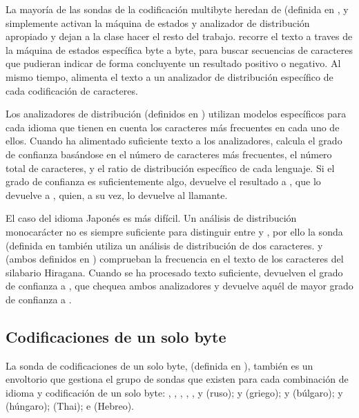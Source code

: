 La mayoría de las sondas de la codificación multibyte heredan de  (definida en , y simplemente activan la máquina de estados y analizador de distribución apropiado y dejan a la clase  hacer el resto del trabajo.  recorre el texto a traves de la máquina de estados específica byte a byte, para buscar secuencias de caracteres que pudieran indicar de forma concluyente un resultado positivo o negativo. Al mismo tiempo,  alimenta el texto a un analizador de distribución específico de cada codificación de caracteres.

Los analizadores de distribución (definidos en ) utilizan modelos específicos para cada idioma que tienen en cuenta los caracteres más frecuentes en cada uno de ellos. Cuando  ha alimentado suficiente texto a los analizadores, calcula el grado de confianza basándose en el número de caracteres más frecuentes, el número total de caracteres, y el ratio de distribución específico de cada lenguaje. Si el grado de confianza es suficientemente algo,  devuelve el resultado a , que lo devuelve a , quien, a su vez, lo devuelve al llamante.

El caso del idioma Japonés es más difícil. Un análisis de distribución monocarácter no es siempre suficiente para distinguir entre  y , por ello la sonda  (definida en  también utiliza un análisis de distribución de dos caracteres.  y  (ambos definidos en ) comprueban la frecuencia en el texto de los caracteres del silabario Hiragana. Cuando se ha procesado texto suficiente, devuelven el grado de confianza a , que chequea ambos analizadores y devuelve aquél de mayor grado de confianza a .

\subsection{Codificaciones de un solo byte}


La sonda de codificaciones de un solo byte,  (definida en ), también es un envoltorio que gestiona el grupo de sondas que existen para cada combinación de idioma y codificación de un solo byte: , , , , , y  (ruso);  y  (griego);  y  (búlgaro);  y  (húngaro);  (Thai);  e  (Hebreo).

